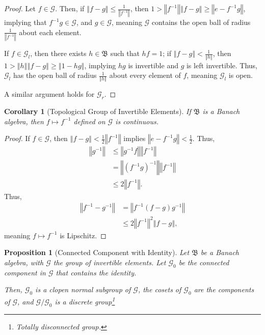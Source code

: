 \documentclass[12pt]{extarticle}
\newcommand{\norm}[1]{\left\Vert #1\right\Vert}
\theoremstyle{plain}
\newtheorem*{corollary}{Corollary}
\newtheorem*{proposition}{Proposition}
\theoremstyle{definition}
\theoremstyle{note}
\renewcommand{\newline}{\hfill\break}
\begin{document}
\begin{proof}
  Let $f\in \mathcal{G}$. Then, if $\norm{f-g} \leq \frac{1}{\norm{f^{-1}}}$, then $1 > \norm{f^{-1}}\norm{f-g} \geq \norm{e-f^{-1}g}$, implying that $f^{-1}g \in \mathcal{G}$, and $g\in \mathcal{G}$, meaning $\mathcal{G}$ contains the open ball of radius $\frac{1}{\norm{f^{-1}}}$ about each element.\newline

  If $f\in \mathcal{G}_{l}$, then there exists $h\in \mathfrak{B}$ such that $hf = 1$; if $\norm{f-g} < \frac{1}{\norm{h}}$, then $1 > \norm{h}\norm{f-g} \geq \norm{1-hg}$, implying $hg$ is invertible and $g$ is left invertible. Thus, $\mathcal{G}_{l}$ has the open ball of radius $\frac{1}{\norm{h}}$ about every element of $f$, meaning $\mathcal{G}_{l}$ is open.\newline

  A similar argument holds for $\mathcal{G}_{r}$.
\end{proof}
\begin{corollary}[Topological Group of Invertible Elements]
  If $\mathfrak{B}$ is a Banach algebra, then $f\mapsto f^{-1}$ defined on $\mathcal{G}$ is continuous.
\end{corollary}
\begin{proof}
  If $f\in \mathcal{G}$, then $\norm{f-g} < \frac{1}{2}\norm{f^{-1}}$ implies $\norm{e-f^{-1}g} < \frac{1}{2}$. Thus,
  \begin{align*}
    \norm{g^{-1}} &\leq \norm{g^{-1}f}\norm{f^{-1}}\\
                  &= \norm{\left(f^{-1}g\right)^{-1}}\norm{f^{-1}}\\
                  &\leq 2\norm{f^{-1}}.
  \end{align*}
  Thus,
  \begin{align*}
    \norm{f^{-1}-g^{-1}} &= \norm{f^{-1}\left(f-g\right)g^{-1}}\\
                         &\leq 2\norm{f^{-1}}^2\norm{f-g},
  \end{align*}
  meaning $f\mapsto f^{-1}$ is Lipschitz.
\end{proof}
\begin{proposition}[Connected Component with Identity]
  Let $\mathfrak{B}$ be a Banach algebra, with $\mathcal{G}$ the group of invertible elements. Let $\mathcal{G}_0$ be the connected component in $\mathcal{G}$ that contains the identity.\newline

  Then, $\mathcal{G}_0$ is a clopen normal subgroup of $\mathcal{G}$, the cosets of $\mathcal{G}_0$ are the components of $\mathcal{G}$, and $\mathcal{G}/\mathcal{G}_0$ is a discrete group\footnote{Totally disconnected group.}
\end{proposition}
\end{document}

